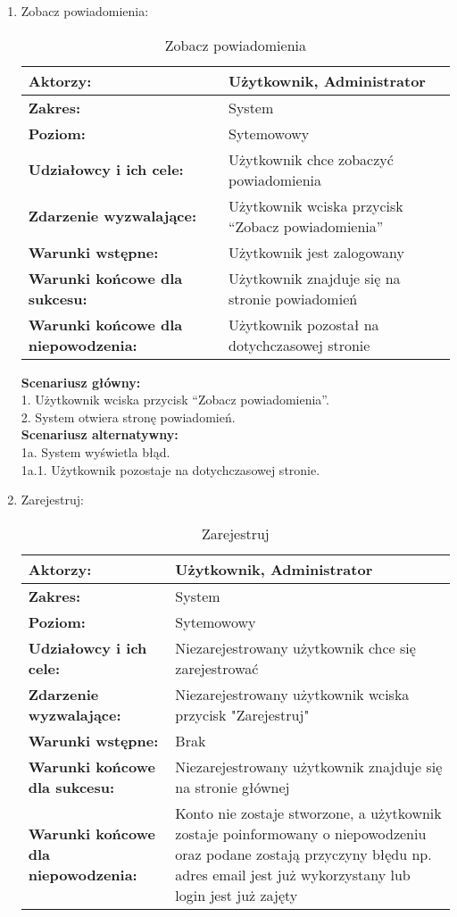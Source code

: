 \begin{enumerate}[label=(\Roman*)]
\item Zobacz powiadomienia:
	\begin{table}[H]
\centering
\caption{Zobacz powiadomienia}
\label{Zobaczpowiadomienia}
\begin{tabular}{|p{7cm}|p{7cm}|}
  \hline 
  \textbf{Aktorzy:} & Użytkownik, Administrator\\
  \hline
  \textbf{Zakres:} & System \\
	\hline
  \textbf{Poziom:} & Sytemowowy \\
	\hline
  \textbf{Udziałowcy i ich cele: } & Użytkownik chce zobaczyć powiadomienia \\
	\hline
  \textbf{Zdarzenie wyzwalające: } & Użytkownik wciska przycisk “Zobacz powiadomienia” \\
	\hline
  \textbf{Warunki wstępne: } & Użytkownik jest zalogowany 
 \\
	\hline
  \textbf{Warunki końcowe dla sukcesu:} & Użytkownik znajduje się na stronie powiadomień\\
	\hline
  \textbf{Warunki końcowe dla niepowodzenia:} & Użytkownik pozostał na dotychczasowej stronie \\
  \hline
\end{tabular} 
\end{table}
\textbf{Scenariusz główny:}\\
1. Użytkownik wciska przycisk “Zobacz powiadomienia”.\\
2. System otwiera stronę powiadomień.\\
\textbf{Scenariusz alternatywny:}\\
1a. System wyświetla błąd.\\
1a.1. Użytkownik pozostaje na dotychczasowej stronie.\\

\item Zarejestruj:
	\begin{table}[H]
\centering
\caption{Zarejestruj}
\label{Zarejestruj}
\begin{tabular}{|p{7cm}|p{7cm}|}
  \hline 
  \textbf{Aktorzy:} & Użytkownik, Administrator\\
  \hline
  \textbf{Zakres:} & System \\
	\hline
  \textbf{Poziom:} & Sytemowowy \\
	\hline
  \textbf{Udziałowcy i ich cele: } & Niezarejestrowany użytkownik chce się zarejestrować \\
	\hline
  \textbf{Zdarzenie wyzwalające: } & Niezarejestrowany użytkownik wciska przycisk "Zarejestruj"\\
	\hline
  \textbf{Warunki wstępne: } & Brak \\
	\hline
  \textbf{Warunki końcowe dla sukcesu:} & Niezarejestrowany użytkownik znajduje się na stronie głównej\\
	\hline
  \textbf{Warunki końcowe dla niepowodzenia:} & Konto nie zostaje stworzone, a użytkownik zostaje poinformowany o niepowodzeniu oraz podane zostają przyczyny błędu np. adres email jest już wykorzystany lub login jest już zajęty \\
  \hline
\end{tabular} 
\end{table}


\end{enumerate}
